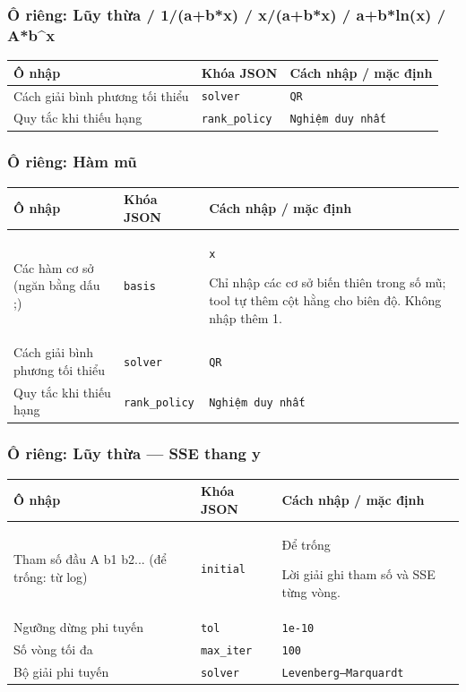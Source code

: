 \subsubsection*{Ô riêng: Lũy thừa /\allowbreak{} 1/\allowbreak{}(a+b*x) /\allowbreak{} x/\allowbreak{}(a+b*x) /\allowbreak{} a+b*ln(x) /\allowbreak{} A*b\textasciicircum{}x}
\begin{center}\small\begin{tabular}{@{}p{.32\linewidth}p{.17\linewidth}p{.43\linewidth}@{}}\toprule
Ô nhập & Khóa JSON & Cách nhập / mặc định\\\midrule
Cách giải bình phương tối thiểu & \texttt{solver} & \texttt{QR}\\[3pt]
Quy tắc khi thiếu hạng & \texttt{rank\_policy} & \texttt{Nghiệm duy nhất}\\[3pt]
\bottomrule\end{tabular}\end{center}
\subsubsection*{Ô riêng: Hàm mũ}
\begin{center}\small\begin{tabular}{@{}p{.32\linewidth}p{.17\linewidth}p{.43\linewidth}@{}}\toprule
Ô nhập & Khóa JSON & Cách nhập / mặc định\\\midrule
Các hàm cơ sở (ngăn bằng dấu ;\allowbreak{}) & \texttt{basis} & \texttt{x}
\par Chỉ nhập các cơ sở biến thiên trong số mũ;\allowbreak{} tool tự thêm cột hằng cho biên độ. Không nhập thêm 1.\\[3pt]
Cách giải bình phương tối thiểu & \texttt{solver} & \texttt{QR}\\[3pt]
Quy tắc khi thiếu hạng & \texttt{rank\_policy} & \texttt{Nghiệm duy nhất}\\[3pt]
\bottomrule\end{tabular}\end{center}
\subsubsection*{Ô riêng: Lũy thừa — SSE thang y}
\begin{center}\small\begin{tabular}{@{}p{.32\linewidth}p{.17\linewidth}p{.43\linewidth}@{}}\toprule
Ô nhập & Khóa JSON & Cách nhập / mặc định\\\midrule
Tham số đầu A b1 b2... (để trống: từ log) & \texttt{initial} & Để trống
\par Lời giải ghi tham số và SSE từng vòng.\\[3pt]
Ngưỡng dừng phi tuyến & \texttt{tol} & \texttt{1e-10}\\[3pt]
Số vòng tối đa & \texttt{max\_iter} & \texttt{100}\\[3pt]
Bộ giải phi tuyến & \texttt{solver} & \texttt{Levenberg–Marquardt}\\[3pt]
\bottomrule\end{tabular}\end{center}
